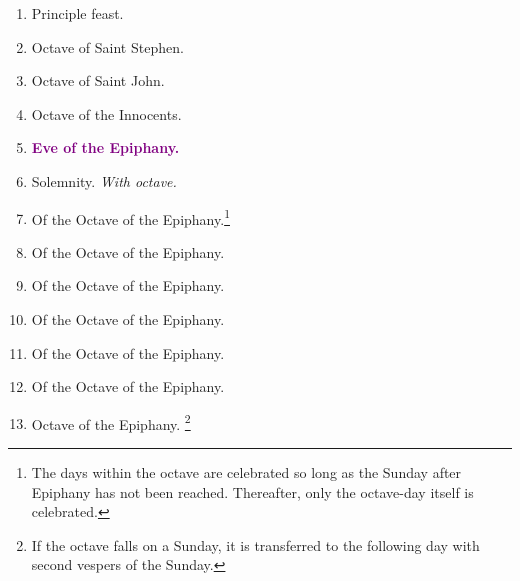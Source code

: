 		\begin{enumerate}
			\item {} Principle feast.
			\item Octave of Saint Stephen.
			\item Octave of Saint John.
			\item Octave of the Innocents.
			\item \textcolor{purple}{\textbf{Eve of the Epiphany.}}
			\item {} Solemnity. \textit{With octave.}
			\item Of the Octave of the Epiphany.\footnote{The days within the octave are celebrated so long as the Sunday after Epiphany has not been reached. Thereafter, only the octave-day itself is celebrated.}
			\item Of the Octave of the Epiphany.
			\item Of the Octave of the Epiphany.
			\item Of the Octave of the Epiphany.
			\item Of the Octave of the Epiphany.
			\item Of the Octave of the Epiphany.
			\item Octave of the Epiphany. \footnote{If the octave falls on a Sunday, it is transferred to the following day with second vespers of the Sunday.}
		\end{enumerate}